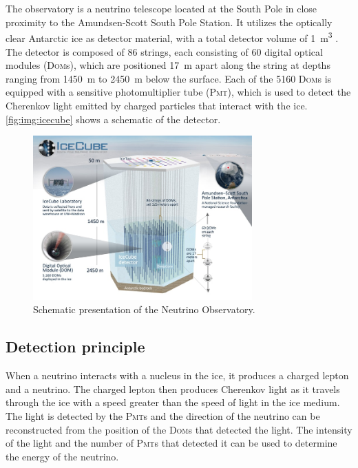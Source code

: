 \section{\icecube}
The \icecube observatory is a neutrino telescope located at the South Pole
in close proximity to the Amundsen-Scott South Pole Station.
It utilizes the optically clear Antarctic ice as detector material,
  with a total detector volume of \SI{1}{\cubic\meter} \cite{icecube_facts}.
The detector is composed of \num{86} strings,
  each consisting of \num{60} digital optical modules (\textsc{Dom}s),
    which are positioned
      \SI{17}{\meter} apart along the string
      at depths ranging from \SI{1450}{\meter} to \SI{2450}{\meter} below the surface.
Each of the \num{5160} \textsc{Dom}s is equipped with a sensitive photomultiplier tube (\textsc{Pmt}),
  which is used to detect the Cherenkov light emitted by charged particles
  that interact with the ice.
%
\autoref{fig:img:icecube} shows a schematic of the \icecube detector.



\begin{figure}
  \centering
  \includegraphics[width=0.75\textwidth]{content/img/icecube_detector_schematic.jpg}
  \caption{
    Schematic presentation of the \icecube Neutrino Observatory. \cite{icecube_homepage}
  }
  \label{fig:img:icecube}
\end{figure}


\subsection{Detection principle}
When a neutrino interacts with a nucleus in the ice,
it produces a charged lepton and a neutrino.
The charged lepton then produces Cherenkov light
  as it travels through the ice
    with a speed greater than the speed of light in the ice medium.
The light is detected by the \textsc{Pmt}s
  and the direction of the neutrino can be reconstructed
  from the position of the \textsc{Dom}s that detected the light.
The intensity of the light and the number of \textsc{Pmt}s that detected it
  can be used to determine the energy of the neutrino.


